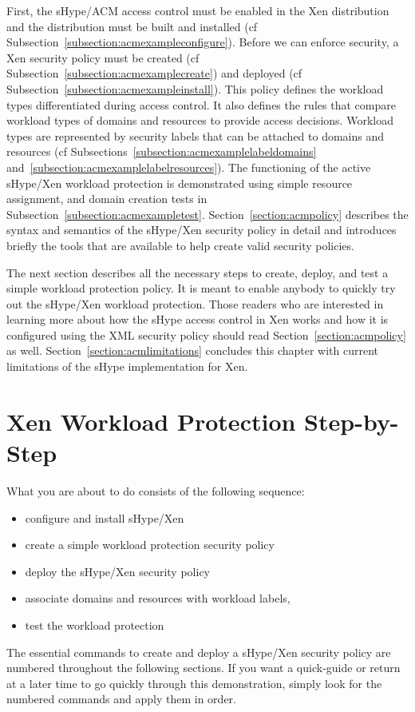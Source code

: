 \documentclass[11pt,twoside,final,openright]{report}
\begin{document}
First, the sHype/ACM access control must be enabled in the Xen
distribution and the distribution must be built and installed (cf
Subsection~\ref{subsection:acmexampleconfigure}). Before we can
enforce security, a Xen security policy must be created (cf
Subsection~\ref{subsection:acmexamplecreate}) and deployed (cf
Subsection~\ref{subsection:acmexampleinstall}).  This policy defines
the workload types differentiated during access control. It also
defines the rules that compare workload types of domains and resources
to provide access decisions. Workload types are represented by
security labels that can be attached to domains and resources (cf
Subsections~\ref{subsection:acmexamplelabeldomains}
and~\ref{subsection:acmexamplelabelresources}).  The functioning of
the active sHype/Xen workload protection is demonstrated using simple
resource assignment, and domain creation tests in
Subsection~\ref{subsection:acmexampletest}.
Section~\ref{section:acmpolicy} describes the syntax and semantics of
the sHype/Xen security policy in detail and introduces briefly the
tools that are available to help create valid security policies.

The next section describes all the necessary steps to create, deploy,
and test a simple workload protection policy. It is meant to enable
anybody to quickly try out the sHype/Xen workload protection. Those
readers who are interested in learning more about how the sHype access
control in Xen works and how it is configured using the XML security
policy should read Section~\ref{section:acmpolicy} as well.
Section~\ref{section:acmlimitations} concludes this chapter with
current limitations of the sHype implementation for Xen.

\section{Xen Workload Protection Step-by-Step}
\label{section:acmexample}

What you are about to do consists of the following sequence:
\begin{itemize}
\item configure and install sHype/Xen
\item create a simple workload protection security policy
\item deploy the sHype/Xen security policy
\item associate domains and resources with workload labels,
\item test the workload protection
\end{itemize}
The essential commands to create and deploy a sHype/Xen security
policy are numbered throughout the following sections. If you want a
quick-guide or return at a later time to go quickly through this
demonstration, simply look for the numbered commands and apply them in
order.
\end{document}
